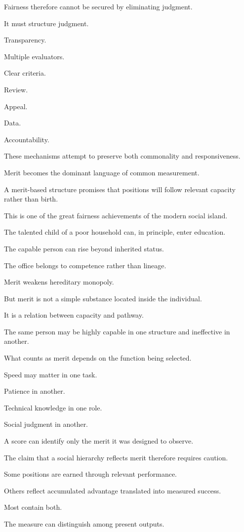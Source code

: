 Fairness therefore cannot be secured by eliminating judgment.

It must structure judgment.

Transparency.

Multiple evaluators.

Clear criteria.

Review.

Appeal.

Data.

Accountability.

These mechanisms attempt to preserve both commonality and responsiveness.

Merit becomes the dominant language of common measurement.

A merit-based structure promises that positions will follow relevant capacity rather than birth.

This is one of the great fairness achievements of the modern social island.

The talented child of a poor household can, in principle, enter education.

The capable person can rise beyond inherited status.

The office belongs to competence rather than lineage.

Merit weakens hereditary monopoly.

But merit is not a simple substance located inside the individual.

It is a relation between capacity and pathway.

The same person may be highly capable in one structure and ineffective in another.

What counts as merit depends on the function being selected.

Speed may matter in one task.

Patience in another.

Technical knowledge in one role.

Social judgment in another.

A score can identify only the merit it was designed to observe.

The claim that a social hierarchy reflects merit therefore requires caution.

Some positions are earned through relevant performance.

Others reflect accumulated advantage translated into measured success.

Most contain both.

The measure can distinguish among present outputs.

